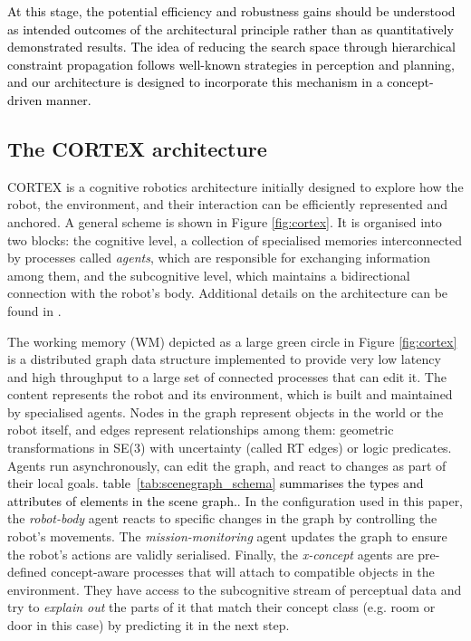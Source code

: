 \documentclass[10pt,a4paper]{article}
\begin{document}
\textcolor{black}{At this stage, the potential efficiency and robustness gains should be understood as intended outcomes of the architectural principle rather than as quantitatively demonstrated results. The idea of reducing the search space through hierarchical constraint propagation follows well-known strategies in perception and planning, and our architecture is designed to incorporate this mechanism in a concept-driven manner. %
}

\subsection{The CORTEX architecture}
 CORTEX is a cognitive robotics architecture initially designed to explore how the robot, the environment, and their interaction can be efficiently represented and anchored. A general scheme is shown in Figure \ref{fig:cortex}. It is organised into two blocks: the cognitive level, a collection of specialised memories interconnected by processes called \textit{agents}, which are responsible for exchanging information among them, and the subcognitive level, which maintains a bidirectional connection with the robot's body. Additional details on the architecture can be found in \cite{proposal-latency-bustos}
 \cite{bustos_cortex_2019}\cite{dsr-icarsc2022}. 


The working memory (WM) depicted as a large green circle in Figure \ref{fig:cortex} is a distributed graph data structure implemented to provide very low latency and high throughput to a large set of connected processes that can edit it. The content represents the robot and its environment, which is built and maintained by specialised agents. Nodes in the graph represent objects in the world or the robot itself, and edges represent relationships among them: geometric transformations in SE(3) with uncertainty (called RT edges) or logic predicates. Agents run asynchronously, can edit the graph, and react to changes as part of their local goals. \textcolor{black}{ table~\ref{tab:scenegraph_schema} summarises the types and attributes of elements in the scene graph.}. In the configuration used in this paper, the \textit{robot-body} agent reacts to specific changes in the graph by controlling the robot's movements. The \textit{mission-monitoring} agent updates the graph to ensure the robot's actions are validly serialised. Finally, the \textit{x-concept} agents are pre-defined concept-aware processes that will attach to compatible objects in the environment. They have access to the subcognitive stream of perceptual data and try to \textit{explain out} the parts of it that match their concept class (e.g. room or door in this case) by predicting it in the next step. 
\end{document}
